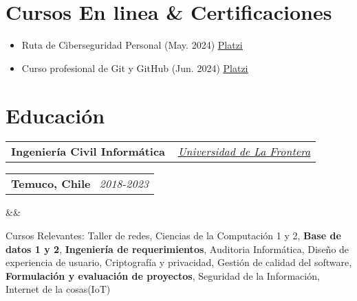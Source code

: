 \documentclass[11pt,a4paper,sans]{moderncv}
\makeatletter
\newcommand{\sectionMargin}{-3mm}
\newcommand*{\customcventry}[7][.13em]{
    \begin{tabular}{@{}l}
    {\bfseries #4} \
    {\itshape #3}
    \end{tabular}
    \hfill
    \begin{tabular}{l@{}}
    {\bfseries #5} \
    {\itshape #2}
    \end{tabular}
    \ifx&#7&%
    \else{\
    \begin{minipage}{\maincolumnwidth}%
    \small#7%
    \end{minipage}}\fi%
    \par\addvspace{#1}
}
\makeatother
\begin{document}
\section{Cursos En linea \& Certificaciones}{
    \begin{itemize}[label=\textbullet]
        \item Ruta de Ciberseguridad Personal (May. 2024) \href{https://1drv.ms/b/c/13c8ae619d64655e/EZYaMe6SBhJAshtvq4ORCQoBwWMYRerI4_xiuqXjORVd0w?e=I4tLqg}{\underline{Platzi}}
        \item Curso profesional de Git y GitHub (Jun. 2024) \href{https://1drv.ms/b/c/13c8ae619d64655e/EXeQGPrTCjFDpmx8pCItVTwB-OS1r-tkKJbmgYnahuxtYg?e=mc9YcH}{\underline{Platzi}}
    \end{itemize}
}

\vspace*{-6mm}

\section{Educación}{
    \customcventry
        {2018-2023}
        { \href{https://1drv.ms/b/c/13c8ae619d64655e/EV5lZJ1hrsgggBOHLAAAAAABHh9OZUbWLd2nx7PTa_OSsg?e=Fedmge}
        {\underline{Universidad de La Frontera}} }
        {Ingeniería Civil Informática}
        {Temuco, Chile}{}{}
        {Cursos Relevantes: 
            Taller de redes, 
            Ciencias de la Computación 1 y 2, 
            \textbf{Base de datos 1 y 2}, 
            \textbf{Ingeniería de requerimientos},
            Auditoria Informática, 
            Diseño de experiencia de usuario, 
            Criptografía y privacidad, 
            Gestión de calidad del software, 
            \textbf{Formulación y evaluación de proyectos},
            Seguridad de la Información,
            Internet de la cosas(IoT)
    }
}

\vspace*{\sectionMargin}
\end{document}
